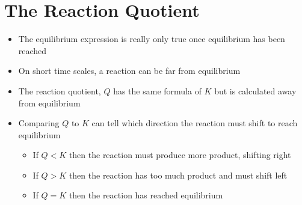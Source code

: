 \documentclass[12pt, openany, letterpaper]{memoir}
\begin{document}
\section{The Reaction Quotient}
\begin{itemize}
	\item The equilibrium expression is really only true once equilibrium has been reached
	\item On short time scales, a reaction can be far from equilibrium
	\item The reaction quotient, $Q$ has the same formula of $K$ but is calculated away from equilibrium
	\item Comparing $Q$ to $K$ can tell which direction the reaction must shift to reach equilibrium
	\begin{itemize}
		\item If $Q<K$ then the reaction must produce more product, shifting right
		\item If $Q>K$ then the reaction has too much product and must shift left
		\item If $Q=K$ then the reaction has reached equilibrium
	\end{itemize}
\end{itemize}
\end{document}
